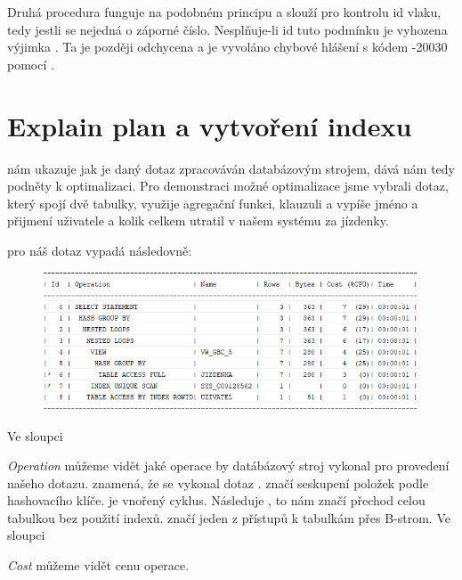 \documentclass[12pt, a4paper, titlepage]{article}
\begin{document}
{Druhá procedura  funguje na podobném principu a slouží pro kontrolu id vlaku, tedy jestli se nejedná o záporné číslo. Nesplňuje-li id tuto podmínku je vyhozena výjimka . Ta je později odchycena a je vyvoláno chybové hlášení s kódem -20030 pomocí .

\clearpage


\section{Explain plan a vytvoření indexu}

 nám ukazuje jak je daný dotaz zpracováván databázovým strojem, dává nám tedy podněty k optimalizaci. Pro demonstraci možné optimalizace jsme vybrali dotaz, který spojí dvě tabulky, využije agregační funkci, klauzuli  a vypíše jméno a přijmení uživatele a kolik celkem utratil v našem systému za jízdenky.
\bigskip

 pro náš dotaz vypadá následovně:

\begin{center}
\begin{figure}[h]
    \includegraphics[scale=0.8]{ep_pred.png}
\end{figure}
\end{center}

Ve sloupci {\textit{Operation} můžeme vidět jaké operace by datábázový stroj vykonal pro provedení našeho dotazu.  znamená, že se vykonal dotaz .  značí seskupení položek podle hashovacího klíče.  je vnořený cyklus. Následuje , to nám značí přechod celou tabulkou bez použití indexů.  značí jeden z přístupů k tabulkám přes B-strom. Ve sloupci {\textit{Cost} můžeme vidět cenu operace.
\bigskip

}}}
\end{document}
